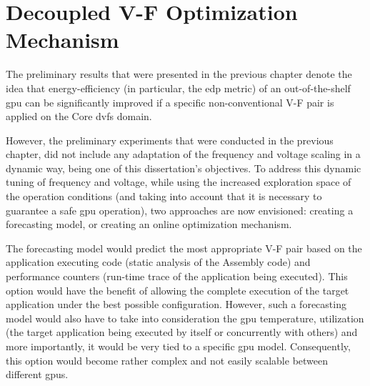
\chapter{Decoupled V-F Optimization Mechanism}
\label{chapter:mech}


The preliminary results that were presented in the previous chapter denote the idea that energy-efficiency (in particular, the \acrshort{edp} metric) of an out-of-the-shelf \acrshort{gpu} can be significantly improved if a specific non-conventional V-F pair is applied on the Core \acrshort{dvfs} domain. 

However, the preliminary experiments that were conducted in the previous chapter, did not include any adaptation of the frequency and voltage scaling in a dynamic way, being one of this dissertation's objectives.
To address this dynamic tuning of frequency and voltage, while using the increased exploration space of the operation conditions (and taking into account that it is necessary to guarantee a safe \acrshort{gpu} operation), two approaches are now envisioned: creating a forecasting model, or creating an online optimization mechanism.

The forecasting model would predict the most appropriate V-F pair based on the application executing code (static analysis of the Assembly code) and performance counters (run-time trace of the application being executed). This option would have the benefit of allowing the complete execution of the target application under the best possible configuration. However, such a forecasting model would also have to take into consideration the \acrshort{gpu} temperature, utilization (the target application being executed by itself or concurrently with others) and more importantly, it would be very tied to a specific \acrshort{gpu} model. Consequently, this option would become rather complex and not easily scalable between different \acrshort{gpu}s.

